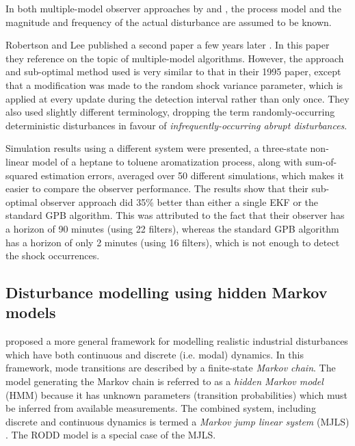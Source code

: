 In both multiple-model observer approaches by \cite{eriksson_classification_1996} and \cite{robertson_detection_1995}, the process model and the magnitude and frequency of the actual disturbance are assumed to be known.

Robertson and Lee published a second paper a few years later \citep{robertson_method_1998}. In this paper they reference \cite{andersson_adaptive_1985} on the topic of multiple-model algorithms.  However, the approach and sub-optimal method used is very similar to that in their 1995 paper, except that a modification was made to the random shock variance parameter, which is applied at every update during the detection interval rather than only once. They also used slightly different terminology, dropping the term randomly-occurring deterministic disturbances in favour of \textit{infrequently-occurring abrupt disturbances}.

Simulation results using a different system were presented, a three-state non-linear model of a heptane to toluene aromatization process, along with sum-of-squared estimation errors, averaged over 50 different simulations, which makes it easier to compare the observer performance. The results show that their sub-optimal observer approach did 35\% better than either a single \gls{EKF} or the standard \gls{GPB} algorithm. This was attributed to the fact that their observer has a horizon of 90 minutes (using 22 filters), whereas the standard \gls{GPB} algorithm has a horizon of only 2 minutes (using 16 filters), which is not enough to detect the shock occurrences.

\subsection{Disturbance modelling using hidden Markov models} \label{sec:lit-hmm}
\label{hidden_markov_models}

\cite{wong_disturbance_2007} proposed a more general framework for modelling realistic industrial disturbances which have both continuous and discrete (i.e. modal) dynamics. In this framework, mode transitions are described by a finite-state \textit{Markov chain}. The model generating the Markov chain is referred to as a \textit{hidden Markov model} (\gls{HMM}) because it has unknown parameters (transition probabilities) which must be inferred from available measurements. The combined system, including discrete and continuous dynamics is termed a \textit{Markov jump linear system} (\gls{MJLS}) \citep{costa_discrete-time_2005}. The \gls{RODD} model is a special case of the \gls{MJLS}.

